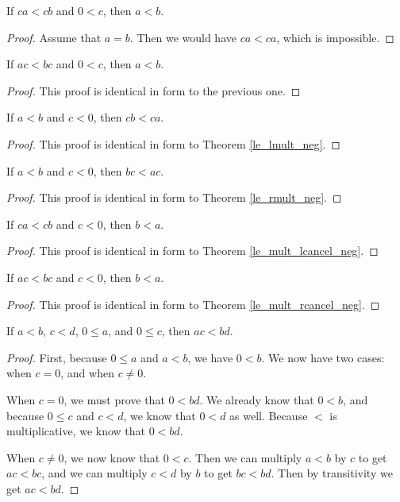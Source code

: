 \documentclass[../../math.tex]{subfiles}
\begin{document}
\begin{theorem}
    If $ca < cb$ and $0 < c$, then $a < b$.
\end{theorem}
\begin{proof}
    Assume that $a = b$.  Then we would have $ca < ca$, which is impossible.
\end{proof}

\begin{theorem}
    If $ac < bc$ and $0 < c$, then $a < b$.
\end{theorem}
\begin{proof}
    This proof is identical in form to the previous one.
\end{proof}

\begin{theorem}
    If $a < b$ and $c < 0$, then $cb < ca$.
\end{theorem}
\begin{proof}
    This proof is identical in form to Theorem \ref{le_lmult_neg}.
\end{proof}

\begin{theorem}
    If $a < b$ and $c < 0$, then $bc < ac$.
\end{theorem}
\begin{proof}
    This proof is identical in form to Theorem \ref{le_rmult_neg}.
\end{proof}

\begin{theorem}
    If $ca < cb$ and $c < 0$, then $b < a$.
\end{theorem}
\begin{proof}
    This proof is identical in form to Theorem \ref{le_mult_lcancel_neg}.
\end{proof}

\begin{theorem}
    If $ac < bc$ and $c < 0$, then $b < a$.
\end{theorem}
\begin{proof}
    This proof is identical in form to Theorem \ref{le_mult_rcancel_neg}.
\end{proof}

\begin{theorem}
    If $a < b$, $c < d$, $0 \leq a$, and $0 \leq c$, then $ac < bd$.
\end{theorem}
\begin{proof}
    First, because $0 \leq a$ and $a < b$, we have $0 < b$.  We now have two
    cases: when $c = 0$, and when $c \neq 0$.

    When $c = 0$, we must prove that $0 < bd$.  We already know that $0 < b$,
    and because $0 \leq c$ and $c < d$, we know that $0 < d$ as well.  Because
    $<$ is multiplicative, we know that $0 < bd$.

    When $c \neq 0$, we now know that $0 < c$.  Then we can multiply $a < b$ by
    $c$ to get $ac < bc$, and we can multiply $c < d$ by $b$ to get $bc < bd$.
    Then by transitivity we get $ac < bd$.
\end{proof}
\end{document}
